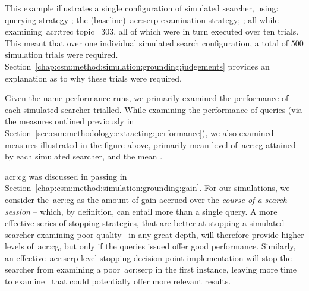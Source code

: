 \begin{figure}[h]
    \centering
    \vspace*{-6mm}
\end{figure}

This example illustrates a single configuration of simulated searcher, using: querying strategy ; the  (baseline)~\gls{acr:serp} examination strategy;
; all while examining~\gls{acr:trec} topic \textnumero~303, all of which were in turn executed over ten trials. This meant that over one individual simulated search configuration, a total of $500$ simulation trials were required. Section~\ref{chap:csm:method:simulation:grounding:judgements} provides an explanation as to why these trials were required.

Given the name performance runs, we primarily examined the performance of each simulated searcher trialled. While examining the performance of queries (via the measures outlined previously in Section~\ref{sec:csm:methodology:extracting:performance}), we also examined measures illustrated in the figure above, primarily mean level of~\gls{acr:cg} attained by each simulated searcher, and the mean .

\gls{acr:cg} was discussed in passing in Section~\ref{chap:csm:method:simulation:grounding:gain}. For our simulations, we consider the~\gls{acr:cg} as the amount of gain accrued over the \emph{course of a search session} -- which, by definition, can entail more than a single query. A more effective series of stopping strategies, that are better at stopping a simulated searcher examining poor quality~ in any great depth, will therefore provide higher levels of~\gls{acr:cg}, but only if the queries issued offer good performance. Similarly, an effective~\gls{acr:serp} level stopping decision point implementation will stop the searcher from examining a poor~\gls{acr:serp} in the first instance, leaving more time to examine~ that could potentially offer more relevant results.

